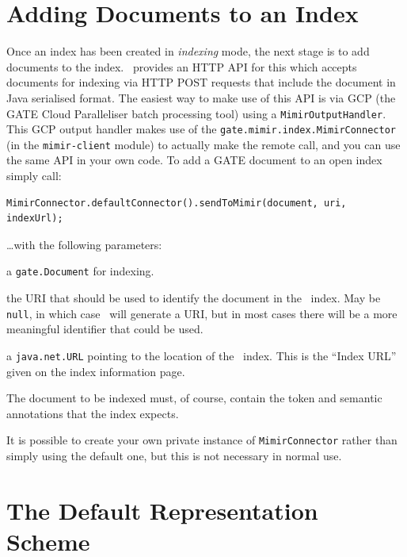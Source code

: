 \section{Adding Documents to an Index}\label{sec:indexing:add-docs}

Once an index has been created in {\em indexing} mode, the next stage is to add
documents to the index.  \Mimir\ provides an HTTP API for this which accepts
documents for indexing via HTTP POST requests that include the document in Java
serialised format.  The easiest way to make use of this API is via GCP (the
GATE Cloud Paralleliser batch processing tool) using a
\lstinline!MimirOutputHandler!.  This GCP output handler makes use of the
\lstinline!gate.mimir.index.MimirConnector! (in the {\tt mimir-client} module)
to actually make the remote call, and you can use the same API in your own
code.  To add a GATE document to an open index simply call:
\begin{lstlisting}[breaklines]
MimirConnector.defaultConnector().sendToMimir(document, uri, indexUrl);
\end{lstlisting}
%
\ldots{}with the following parameters:
\bde
\item[document] a \lstinline!gate.Document! for indexing.
\item[uri] the URI that should be used to identify the document in the \Mimir\
  index.  May be \lstinline!null!, in which case \Mimir\ will generate a URI,
  but in most cases there will be a more meaningful identifier that could be
  used.
\item[indexUrl] a \lstinline!java.net.URL! pointing to the location of the
  \Mimir\ index.  This is the ``Index URL'' given on the index information page.
\ede

The document to be indexed must, of course, contain the token and semantic
annotations that the index expects.

It is possible to create your own private instance of
\lstinline!MimirConnector! rather than simply using the default one, but this
is not necessary in normal use.

\section{The Default Representation Scheme}\label{sec:indexing:dsah-detail}

